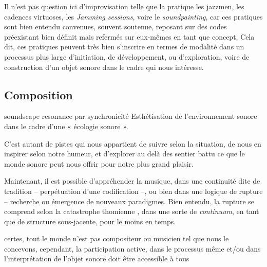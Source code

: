 \documentclass{article}
\newcommand{\footref}[1]{%
  \enotezwritemark{\enmarkstyle\ref{#1}}%
}
\begin{document}
\bigskip

Il n'est pas question ici d'improvisation telle que la pratique les jazzmen, les cadences virtuoses, les \textit{Jamming sessions}, voire le \textit{soundpainting}, car ces pratiques sont bien entendu convenues, souvent soutenue, reposant sur des codes préexistant bien définit mais refermés sur eux-mêmes en tant que concept. Cela dit, ces pratiques peuvent très bien s'inscrire en termes de modalité dans un processus plus large d'initiation, de développement, ou d'exploration, voire de construction d'un objet sonore dans le cadre qui nous intéresse.

\subsection{Composition} 

soundscape
resonance par synchronicité
Esthétisation de l’environnement sonore dans le cadre d’une « écologie sonore ».



\bigskip

C’est autant de pistes qui nous appartient de suivre selon la situation, de nous en inspirer selon notre humeur, et d’explorer au delà des sentier battu ce que le monde sonore peut nous offrir pour notre plus grand plaisir. 

\bigskip

Maintenant, il est possible d'appréhender la musique, dans une continuité dite de tradition -- perpétuation d'une codification --, ou bien dans une logique de rupture -- recherche ou émergence de nouveaux paradigmes. Bien entendu, la rupture se comprend selon la catastrophe thomienne%
, dans une sorte de \textit{continuum}, en tant que de structure sous-jacente, pour le moins en temps. 

certes, tout le monde n’est pas compositeur ou musicien tel que nous le concevons, cependant, la participation active, dans le processus même et/ou dans l’interprétation de l’objet sonore doit être accessible à tous 
\end{document}
